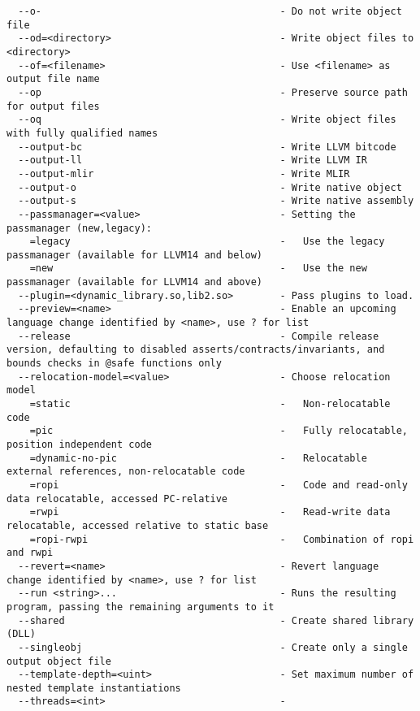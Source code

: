 \documentclass{studrep}
\begin{document}
\begin{verbatim}
  --o-                                         - Do not write object file
  --od=<directory>                             - Write object files to <directory>
  --of=<filename>                              - Use <filename> as output file name
  --op                                         - Preserve source path for output files
  --oq                                         - Write object files with fully qualified names
  --output-bc                                  - Write LLVM bitcode
  --output-ll                                  - Write LLVM IR
  --output-mlir                                - Write MLIR
  --output-o                                   - Write native object
  --output-s                                   - Write native assembly
  --passmanager=<value>                        - Setting the passmanager (new,legacy):
    =legacy                                    -   Use the legacy passmanager (available for LLVM14 and below)
    =new                                       -   Use the new passmanager (available for LLVM14 and above)
  --plugin=<dynamic_library.so,lib2.so>        - Pass plugins to load.
  --preview=<name>                             - Enable an upcoming language change identified by <name>, use ? for list
  --release                                    - Compile release version, defaulting to disabled asserts/contracts/invariants, and bounds checks in @safe functions only
  --relocation-model=<value>                   - Choose relocation model
    =static                                    -   Non-relocatable code
    =pic                                       -   Fully relocatable, position independent code
    =dynamic-no-pic                            -   Relocatable external references, non-relocatable code
    =ropi                                      -   Code and read-only data relocatable, accessed PC-relative
    =rwpi                                      -   Read-write data relocatable, accessed relative to static base
    =ropi-rwpi                                 -   Combination of ropi and rwpi
  --revert=<name>                              - Revert language change identified by <name>, use ? for list
  --run <string>...                            - Runs the resulting program, passing the remaining arguments to it
  --shared                                     - Create shared library (DLL)
  --singleobj                                  - Create only a single output object file
  --template-depth=<uint>                      - Set maximum number of nested template instantiations
  --threads=<int>                              -

\end{verbatim}
\end{document}
